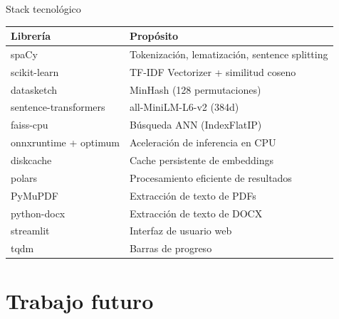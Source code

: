 \documentclass[aspectratio=169]{beamer}
\begin{document}
\begin{frame}{Stack tecnológico}
  \begin{center}
    \small
    \begin{tabular}{lp{8cm}}
      \textbf{Librería} & \textbf{Propósito} \\
      \hline
      spaCy         & Tokenización, lematización, sentence splitting \\
      scikit-learn  & TF-IDF Vectorizer + similitud coseno \\
      datasketch    & MinHash (128 permutaciones) \\
      sentence-transformers & all-MiniLM-L6-v2 (384d) \\
      faiss-cpu     & Búsqueda ANN (IndexFlatIP) \\
      onnxruntime + optimum & Aceleración de inferencia en CPU \\
      diskcache     & Cache persistente de embeddings \\
      polars        & Procesamiento eficiente de resultados \\
      PyMuPDF       & Extracción de texto de PDFs \\
      python-docx   & Extracción de texto de DOCX \\
      streamlit     & Interfaz de usuario web \\
      tqdm          & Barras de progreso \\
    \end{tabular}
  \end{center}
\end{frame}

\section{Trabajo futuro}
\end{document}
